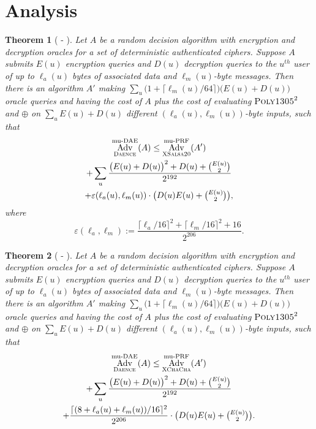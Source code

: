 \documentclass{article}
\newtheorem{theorem}{Theorem}
\def\operatorsc#1{{%
  \ifmmode\let\next=\operatorname\else\let\next=\relax\fi\next{\textsc{#1}}}}
\def\Salsa#1/{\operatorsc{Salsa#1}}
\def\ChaCha#1/{\operatorsc{ChaCha#1}}
\def\XChaCha#1/{\operatorsc{XChaCha#1}}
\def\XSalsa#1/{\operatorsc{XSalsa#1}}
\def\Poly#1/{\operatorsc{Poly#1}}
\def\DAENCE/{\operatorsc{Daence}}
\def\muPRF{%
  \ifmmode\def\next{\operatorname{mu-PRF}}%
    \else\def\next/{mu-\textsc{prf}}%
  \fi\next}
\def\muDAE{%
  \ifmmode\def\next{\operatorname{mu-DAE}}%
    \else\def\next/{mu-\textsc{dae}}%
  \fi\next}
\DeclareMathOperator{\Adv}{Adv}
\newcommand{\collisionbound}{\varepsilon}
\begin{document}
\section{Analysis}

\begin{theorem}[\Salsa20/-\DAENCE/]\label{salsa20-daence}
  Let $A$ be a random decision algorithm with encryption and
   decryption oracles for a set of deterministic authenticated
   ciphers.
  Suppose $A$ submits $E(u)$ encryption queries and $D(u)$ decryption
   queries to the $u^{\mathit{th}}$ user of up to $\ell_a(u)$ bytes of
   associated data and $\ell_m(u)$-byte messages.
  Then there is an algorithm $A'$ making
   $\sum_u \bigl(1 + \lceil\ell_m(u)/64\rceil\bigr)
     \bigl(E(u) + D(u)\bigr)$
   oracle queries and having the cost of $A$ plus the cost of
   evaluating $\Poly1305/^2$ and $\oplus$ on
   $\sum_u E(u) + D(u)$
   different $(\ell_a(u), \ell_m(u))$-byte inputs,
   such that
%
  \begin{multline*}
    \Adv^{\muDAE}_{\DAENCE/}(A)
     \leq \Adv^{\muPRF}_{\XSalsa20/}(A') \\
            + \sum_u
                \frac{\bigl(E(u) + D(u)\bigr)^2 + D(u) + \binom{E(u)}{2}}
                     {2^{192}} \\
                + \collisionbound(\ell_a(u), \ell_m(u))
                  \cdot
                  {\textstyle\bigl(D(u) E(u) + \binom{E(u)}{2}\bigr)},
  \end{multline*}
%
   where
  \[
    \collisionbound(\ell_a, \ell_m)
    := \frac{\lceil\ell_a/16\rceil^2 + \lceil\ell_m/16\rceil^2 + 16}
            {2^{206}}.
  \]
\end{theorem}

\begin{theorem}[\ChaCha/-\DAENCE/]\label{chacha-daence}
  Let $A$ be a random decision algorithm with encryption and
   decryption oracles for a set of deterministic authenticated
   ciphers.
  Suppose $A$ submits $E(u)$ encryption queries and $D(u)$ decryption
   queries to the $u^{\mathit{th}}$ user of up to $\ell_a(u)$ bytes of
   associated data and $\ell_m(u)$-byte messages.
  Then there is an algorithm $A'$ making
   $\sum_u \bigl(1 + \lceil\ell_m(u)/64\rceil\bigr)
     \bigl(E(u) + D(u)\bigr)$
   oracle queries and having the cost of $A$ plus the cost of
   evaluating $\Poly1305/^2$ and $\oplus$ on
   $\sum_u E(u) + D(u)$
   different $(\ell_a(u), \ell_m(u))$-byte inputs,
   such that
%
  \begin{multline*}
    \Adv^{\muDAE}_{\DAENCE/}(A)
     \leq \Adv^{\muPRF}_{\XChaCha/}(A') \\
            + \sum_u
                \frac{\bigl(E(u) + D(u)\bigr)^2 + D(u) + \binom{E(u)}{2}}
                     {2^{192}} \\
                + \frac{\lceil(8 + \ell_a(u) + \ell_m(u))/16\rceil^2}{2^{206}}
                  \cdot
                  {\textstyle\bigl(D(u) E(u) + \binom{E(u)}{2}\bigr)}.
  \end{multline*}
\end{theorem}
\end{document}
